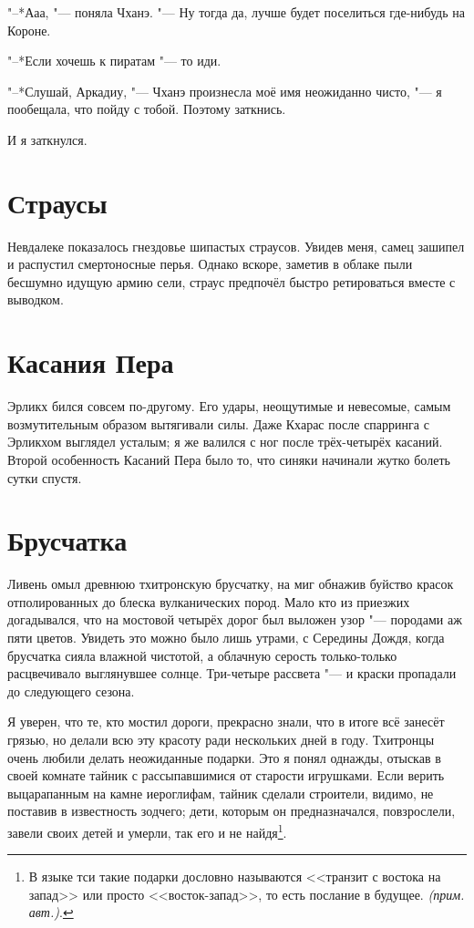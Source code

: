 \documentclass[a4paper,10pt]{book}
\newcommand{\authornote}{\textit{(прим. авт.)}}
\begin{document}
"--*Ааа, "--- поняла Чханэ. "--- Ну тогда да, лучше будет поселиться где-нибудь на Короне.

"--*Если хочешь к пиратам "--- то иди.

"--*Слушай, Аркадиу, "--- Чханэ произнесла моё имя неожиданно чисто, "--- я пообещала, что пойду с тобой. Поэтому заткнись.

И я заткнулся.
 
 \section{Страусы}

 Невдалеке показалось гнездовье шипастых страусов. Увидев меня, самец зашипел и распустил смертоносные перья. Однако вскоре, заметив в облаке пыли бесшумно идущую армию сели, страус предпочёл быстро ретироваться вместе с выводком.
 
\section{Касания Пера}

 Эрликх бился совсем по-другому. Его удары, неощутимые и невесомые, самым возмутительным образом вытягивали силы. Даже Кхарас после спарринга с Эрликхом выглядел усталым; я же валился с ног после трёх-четырёх касаний. Второй особенность Касаний Пера было то, что синяки начинали жутко болеть сутки спустя.

 
 \section{Брусчатка}

Ливень омыл древнюю тхитронскую брусчатку, на миг обнажив буйство красок отполированных 
до блеска вулканических пород. Мало кто из приезжих догадывался, что на мостовой 
четырёх дорог был выложен узор "--- породами аж пяти цветов. Увидеть это 
можно было лишь утрами, с Середины Дождя, когда брусчатка сияла влажной 
чистотой, а облачную серость только-только расцвечивало выглянувшее солнце. Три-четыре 
рассвета "--- и краски пропадали до следующего сезона.

Я уверен, что те, кто мостил дороги, прекрасно знали, что в итоге всё занесёт грязью, но делали всю эту красоту ради нескольких дней в году. Тхитронцы очень любили делать неожиданные подарки. Это я понял однажды, отыскав в своей комнате  тайник с рассыпавшимися от старости игрушками. Если верить выцарапанным на камне иероглифам, тайник сделали строители, видимо, не поставив в известность зодчего; дети, которым он предназначался, повзрослели, завели своих детей и умерли, так его и не найдя\footnote{В языке тси такие подарки дословно называются <<транзит с востока на запад>> или просто <<восток-запад>>, то есть послание в будущее. \authornote.}.
  
\end{document}
